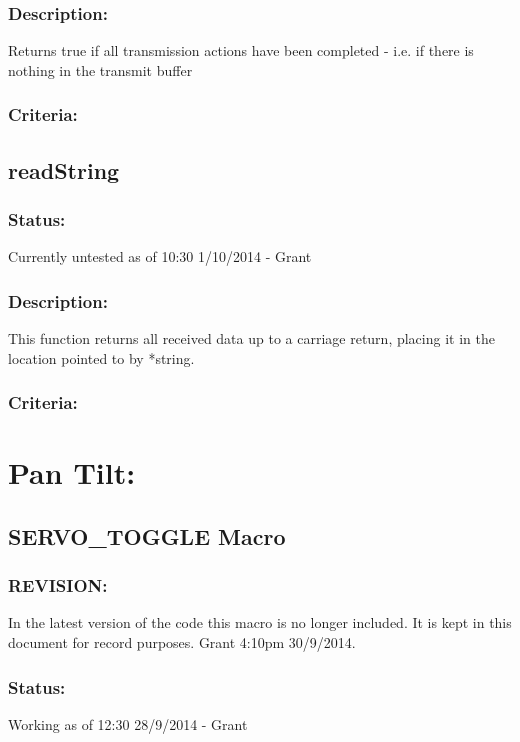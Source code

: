 \documentclass[]{report}
\begin{document}
\subsubsection{Description:}
Returns true if all transmission actions have been completed - i.e. if there is nothing in the transmit buffer

\subsubsection{Criteria:}


\subsection{readString}
\subsubsection{Status:}
Currently untested as of 10:30 1/10/2014 - Grant

\subsubsection{Description:}
This function returns all received data up to a carriage return, placing it in the location pointed to by *string.

\subsubsection{Criteria:}

\section{Pan Tilt:}

\subsection{SERVO\_TOGGLE Macro}

\subsubsection{REVISION:}
In the latest version of the code this macro is no longer included. It is kept in this document for record purposes. Grant 4:10pm 30/9/2014.

\subsubsection{Status:}
Working as of 12:30 28/9/2014 - Grant
\end{document}
